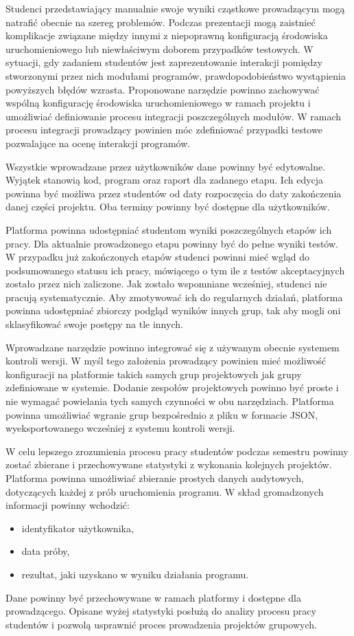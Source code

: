 Studenci przedstawiający manualnie swoje wyniki cząstkowe prowadzącym mogą natrafić obecnie na szereg problemów.
Podczas prezentacji mogą zaistnieć komplikacje związane między innymi z niepoprawną konfiguracją środowiska uruchomieniowego lub niewłaściwym doborem przypadków testowych.
W sytuacji, gdy zadaniem studentów jest zaprezentowanie interakcji pomiędzy stworzonymi
przez nich modułami programów, prawdopodobieństwo wystąpienia powyższych błędów
wzrasta.
Proponowane narzędzie powinno zachowywać wspólną konfigurację środowiska uruchomieniowego w ramach projektu i umożliwiać definiowanie procesu integracji poszczególnych modułów. 
W ramach procesu integracji prowadzący powinien móc zdefiniować przypadki testowe pozwalające na ocenę interakcji programów.

Wszystkie wprowadzane przez użytkowników dane powinny być edytowalne.
Wyjątek stanowią kod, program oraz raport dla zadanego etapu.
Ich edycja powinna być możliwa przez studentów od daty rozpoczęcia do daty zakończenia danej części projektu.
Oba terminy powinny być dostępne dla użytkowników.

Platforma powinna udostępniać studentom wyniki poszczególnych etapów ich pracy.
Dla aktualnie prowadzonego etapu powinny być do pełne wyniki testów.
W przypadku już zakończonych etapów studenci powinni mieć wgląd do podsumowanego statusu ich pracy, mówiącego o tym ile z testów akceptacyjnych zostało przez nich zaliczone.
Jak zostało wspomniane wcześniej, studenci nie pracują systematycznie.
Aby zmotywować ich do regularnych działań, platforma powinna udostępniać zbiorczy podgląd wyników innych grup, tak aby mogli oni sklasyfikować swoje postępy na tle innych.

Wprowadzane narzędzie powinno integrować się z używanym obecnie systemem kontroli wersji.
W myśl tego założenia prowadzący powinien mieć możliwość konfiguracji na platformie takich samych grup projektowych jak grupy zdefiniowane w systemie.
Dodanie zespołów projektowych powinno być proste i nie wymagać powielania tych samych czynności w obu narzędziach.
Platforma powinna umożliwiać wgranie grup bezpośrednio z pliku w formacie JSON, wyeksportowanego wcześniej z systemu kontroli wersji.

W celu lepszego zrozumienia procesu pracy studentów podczas semestru powinny zostać zbierane i przechowywane statystyki z wykonania kolejnych projektów.
Platforma powinna umożliwiać zbieranie prostych danych audytowych, dotyczących każdej z prób uruchomienia programu.
W skład gromadzonych informacji powinny wchodzić:
\begin{itemize}
\item identyfikator użytkownika,
\item data próby,
\item rezultat, jaki uzyskano w wyniku działania programu.
\end{itemize}
Dane powinny być przechowywane w ramach platformy i dostępne dla prowadzącego.
Opisane wyżej statystyki posłużą do analizy procesu pracy studentów i pozwolą usprawnić proces prowadzenia projektów grupowych.

